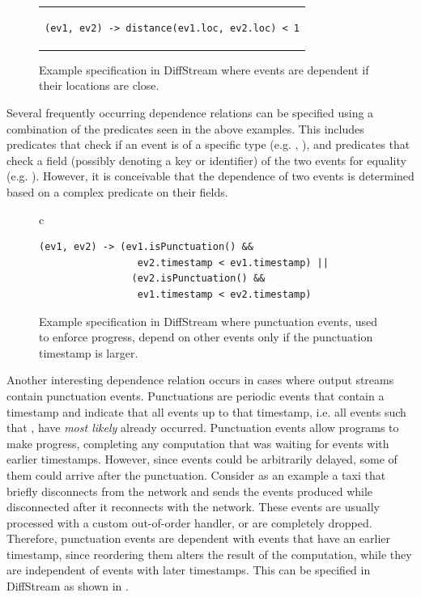 \begin{figure}[t]
  \centering \footnotesize{}
\begin{tabular}{c}
\begin{lstlisting}[basicstyle=\ttfamily\small,linewidth=9cm]
  (ev1, ev2) -> distance(ev1.loc, ev2.loc) < 1
\end{lstlisting}
\end{tabular}
  \caption{Example specification in DiffStream where  events are dependent if their locations are close.}
  \label{fig:proximity-example-dependencies}
\end{figure}

Several frequently occurring dependence relations can be specified
using a combination of the predicates seen in the above examples. This
includes predicates that check if an event is of a specific type
(e.g. , ), and predicates that
check a field (possibly denoting a key or identifier) of the two
events for equality (e.g. ). However, it is conceivable that the dependence of two
events is determined based on a complex predicate on their fields.

\begin{figure}[t]
  \centering \footnotesize{}
\begin{tabular}{c}
\begin{lstlisting}[basicstyle=\ttfamily\small,linewidth=10cm]
  (ev1, ev2) -> (ev1.isPunctuation() &&
                 ev2.timestamp < ev1.timestamp) ||
                (ev2.isPunctuation() &&
                 ev1.timestamp < ev2.timestamp)
\end{lstlisting}
\end{tabular}
  \caption{Example specification in DiffStream where punctuation events, used to enforce progress, depend on other events only if the punctuation timestamp is larger.}
  \label{fig:punctuation-example-dependencies}
\end{figure}

Another interesting dependence relation occurs in cases where output streams contain punctuation events.
Punctuations are periodic events that contain a timestamp and indicate
that all events up to that timestamp, i.e. all events  such that , have \emph{most likely} already occurred.
Punctuation events allow programs to make progress, completing any
computation that was waiting for events with earlier
timestamps. However, since events could be arbitrarily delayed, some
of them could arrive after the punctuation.
Consider as an example a taxi that briefly
disconnects from the network and sends the events produced while disconnected
after it reconnects with the network. These events are usually
processed with a custom out-of-order handler, or are completely
dropped. Therefore, punctuation events are dependent with events
that have an earlier timestamp, since reordering them alters the result of the computation, while they are independent of events with later timestamps. This can be specified in DiffStream as
shown in .

